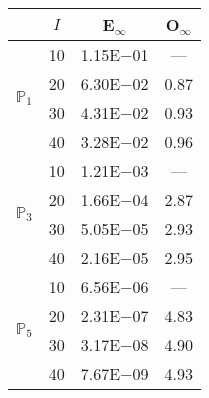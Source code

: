 \begin{table}[H]
\centering
\begin{tabular}{@{}l c c c@{}}
\toprule
 & $I$ & E$_{\infty}$ & O$_{\infty}$\\
\midrule
\multirow{4}{*}{$\mathbb{P}_{1}$}
 & 10 & 1.15E$-$01 & ---\\
 & 20 & 6.30E$-$02 & 0.87  \\
 & 30 & 4.31E$-$02 & 0.93  \\
 & 40 & 3.28E$-$02 & 0.96  \\
\midrule
\multirow{4}{*}{$\mathbb{P}_{3}$}
 & 10 & 1.21E$-$03 & ---\\
 & 20 & 1.66E$-$04 & 2.87  \\
 & 30 & 5.05E$-$05 & 2.93  \\
 & 40 & 2.16E$-$05 & 2.95  \\
\midrule
\multirow{4}{*}{$\mathbb{P}_{5}$}
 & 10 & 6.56E$-$06 & ---\\
 & 20 & 2.31E$-$07 & 4.83  \\
 & 30 & 3.17E$-$08 & 4.90  \\
 & 40 & 7.67E$-$09 & 4.93  \\
\bottomrule
\end{tabular}
\end{table}
